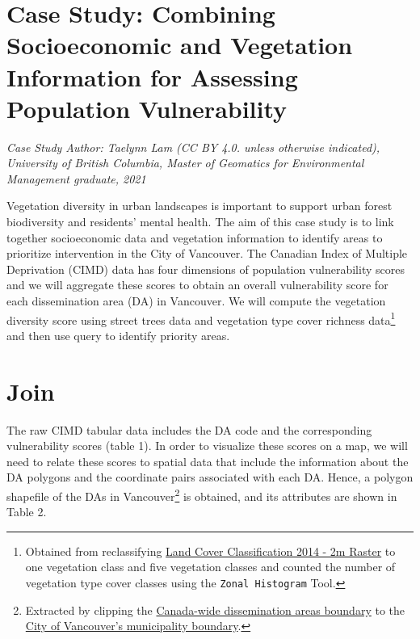 \documentclass[
]{book}
\begin{document}
\section{Case Study: Combining Socioeconomic and Vegetation Information for Assessing Population Vulnerability}\label{case-study-combining-socioeconomic-and-vegetation-information-for-assessing-population-vulnerability}

\emph{Case Study Author: Taelynn Lam (CC BY 4.0. unless otherwise indicated), University of British Columbia, Master of Geomatics for Environmental Management graduate, 2021}

Vegetation diversity in urban landscapes is important to support urban forest biodiversity and residents' mental health. The aim of this case study is to link together socioeconomic data and vegetation information to identify areas to prioritize intervention in the City of Vancouver. The Canadian Index of Multiple Deprivation (CIMD) \citep{statistics_canada_canadian_2019} data has four dimensions of population vulnerability scores and we will aggregate these scores to obtain an overall vulnerability score for each dissemination area (DA) in Vancouver. We will compute the vegetation diversity score using street trees data \citep{city_of_vancouver_street_2012} and vegetation type cover richness data\footnote{Obtained from reclassifying \href{http://www.metrovancouver.org/data}{Land Cover Classification 2014 - 2m Raster} to one vegetation class and five vegetation classes and counted the number of vegetation type cover classes using the \texttt{Zonal\ Histogram} Tool.} and then use query to identify priority areas.

\section{Join}\label{join}

The raw CIMD tabular data includes the DA code and the corresponding vulnerability scores (table 1). In order to visualize these scores on a map, we will need to relate these scores to spatial data that include the information about the DA polygons and the coordinate pairs associated with each DA. Hence, a polygon shapefile of the DAs in Vancouver\footnote{Extracted by clipping the \href{https://www12.statcan.gc.ca/census-recensement/2011/geo/bound-limit/bound-limit-2016-eng.cfm}{Canada-wide dissemination areas boundary} to the \href{https://opendata.vancouver.ca/explore/dataset/city-boundary}{City of Vancouver's municipality boundary}.} is obtained, and its attributes are shown in Table 2.
\end{document}
